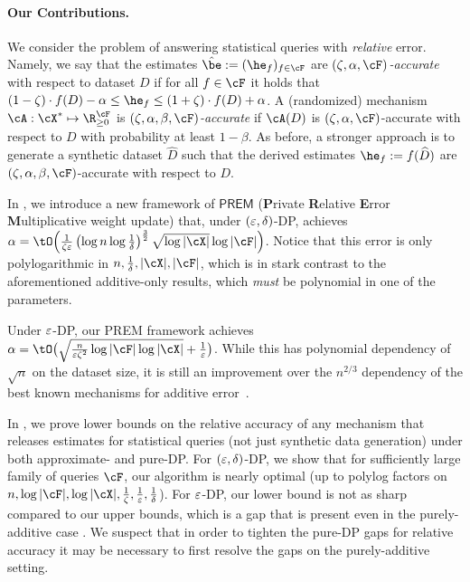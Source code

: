 \paragraph{Our Contributions.}
We consider the problem of answering statistical queries with {\em relative} error. Namely, we say that the estimates $\hat{\be} := (\he_f)_{f\in \cF}$ are \emph{$(\zeta,\alpha, \cF)$-accurate} with respect to dataset $D$ if for all $f \in \cF$ it holds that $(1 - \zeta) \cdot f(D) - \alpha \leq \he_f \leq (1 + \zeta) \cdot f(D) + \alpha$.
A (randomized) mechanism $\cA:\cX^* \mapsto\R_{\ge 0}^\cF$ is \emph{$(\zeta, \alpha, \beta, \cF)$-accurate} if $\cA(D)$ is $(\zeta, \alpha, \cF)$-accurate with respect to $D$ with probability at least $1 - \beta$.
As before, a stronger approach is to generate a synthetic dataset $\widehat{D}$ such that the derived estimates $\he_f := f(\widehat{D})$ are $(\zeta, \alpha, \beta, \cF)$-accurate with respect to $D$.



In , we introduce a new framework 
of $\mathsf{PREM}$ ({\bf P}rivate {\bf R}elative {\bf E}rror {\bf M}ultiplicative weight update) that, under $(\varepsilon,\delta)$-DP, achieves $\alpha = \tO\Big(\frac{1}{\zeta\eps} \prn{\log n \log \frac1\delta}^{\frac32} \sqrt{\log |\cX|}\log|\cF| \Big)$. Notice that this error is only polylogarithmic in $n, \frac{1}{\delta}, |\cX|, |\cF|$, which is in stark contrast to the aforementioned additive-only results, which \emph{must} be polynomial in one of the parameters.

Under $\varepsilon$-DP, our PREM framework achieves  
$\alpha = \tO\big(\sqrt{\frac{n}{\eps \zeta^2}\log |{\cF}|\log|{\cX}|}+\frac{1}{\eps}\big)$. While this has polynomial dependency of $\sqrt{n}$ on the dataset size, it is still an improvement over the $n^{2/3}$ dependency of the best known mechanisms for additive error~\citep{BlumLR13,HardtLM12}.


In , we prove lower bounds on the relative accuracy of any mechanism that releases estimates for statistical queries (not just synthetic data generation) under both approximate- and pure-DP. For $(\varepsilon, \delta)$-DP, we show that for sufficiently large family of queries $\cF$, our algorithm is nearly optimal (up to polylog factors on $n,\log|\cF|,\log|\cX|,\frac{1}{\zeta},\frac{1}{\eps},\frac{1}{\delta}$). For $\varepsilon$-DP, our lower bound is not as sharp compared to our upper bounds, which is a gap that is present even in the purely-additive case \citep{DPorg-open-problem-optimal-query-release}. We suspect that in order to tighten the pure-DP gaps for relative accuracy it may be necessary to first resolve the gaps on the purely-additive setting.


